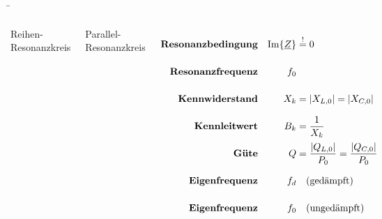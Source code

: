\begin{frame}
{    %

}%
\b{%
\begin{columns}

    Reihen-Resonanzkreis

    Parallel-Resonanzkreis

    \begin{align*}
        \textbf{Resonanzbedingung} && \Im\{\underline{Z}\} &\overset{!}{=} 0
            \vphantom{\bigg|}\\
        \textbf{Resonanzfrequenz} && f_0%
            \vphantom{\bigg|}\\
        \textbf{Kennwiderstand} && X_k &= |X_{L,0}| = |X_{C,0}|
            \vphantom{\bigg|}\\
        \textbf{Kennleitwert} && B_k &= \frac{1}{X_k}%
            \vphantom{\bigg|}\\
        \textbf{Güte} && Q &= \frac{|Q_{L,0}|}{P_{0}} = \frac{|Q_{C,0}|}{P_{0}}
            \vphantom{\bigg|}\\
        \textbf{Eigenfrequenz}&& f_d &\quad\text{(gedämpft)}
            \vphantom{\bigg|}\\
        \textbf{Eigenfrequenz}&& f_0 &\quad\text{(ungedämpft)}
            \vphantom{\bigg|}
    \end{align*}

\end{columns}
}
\end{frame}


